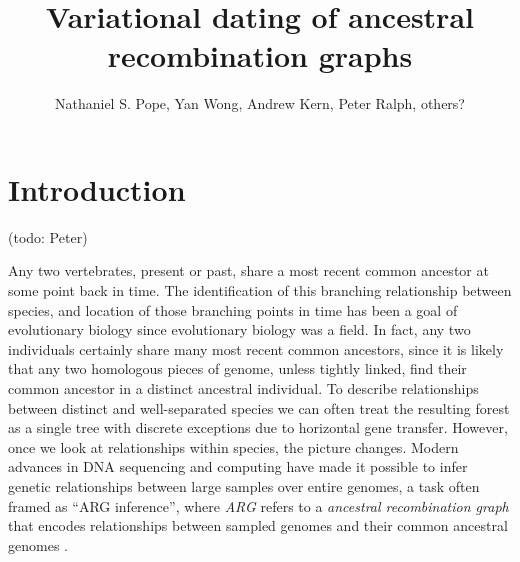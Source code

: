 \documentclass{article}
\title{Variational dating of ancestral recombination graphs}
\author{Nathaniel S. Pope, Yan Wong, Andrew Kern, Peter Ralph, others?}
\date{}
\begin{document}
\maketitle

\section{Introduction} (todo: Peter)

% 
% 
% 
% 
% 
% 
% 


Any two vertebrates, present or past,
share a most recent common ancestor at some point back in time.
The identification of this branching relationship between species,
and location of those branching points in time
has been a goal of evolutionary biology since evolutionary biology was a field.
In fact, any two individuals certainly share many most recent common ancestors,
since it is likely that any two homologous pieces of genome,
unless tightly linked,
find their common ancestor in a distinct ancestral individual.
To describe relationships between distinct and well-separated species
we can often treat the resulting forest as a single tree
with discrete exceptions due to horizontal gene transfer.
However, once we look at relationships within species, the picture changes.
Modern advances in DNA sequencing and computing
have made it possible to infer genetic relationships between large samples
over entire genomes,
a task often framed as ``ARG inference'',
where \emph{ARG} refers to a \emph{ancestral recombination graph}
that encodes relationships between sampled genomes and their common ancestral genomes
\citep[for a discussion of ARGs see][]{ARGreviw}.
\end{document}
